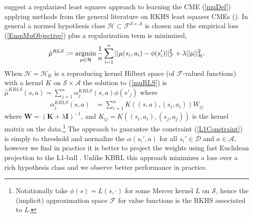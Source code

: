\documentclass[letterpaper]{article}
\newcommand{\GrunewalderEmbeddingsRL}{GrunewalderEmbeddingsMDP}
\newcommand{\GrunewalderEmbeddingsRegression}{GrunewalderEmbeddingsRegression}
\newcommand{\SongNonparametric}{DBLP:journals/jmlr/SongGG10}
\newcommand{\OrmoneitKBRL}{DBLP:journals/ml/OrmoneitS02}
\newcommand{\DuchiProjections}{DBLP:conf/icml/DuchiSSC08}
\newcommand{\TibshiraniLasso}{tibshirani96regression}
\newcommand{\cD}{{\mathcal D}}
\newcommand{\cH}{{\mathcal H}}
\newcommand{\cF}{{\mathcal F}}
\newcommand{\cA}{{\mathcal A}}
\newcommand{\cS}{{\mathcal S}}
\newcommand{\balpha}{{\bm \alpha}}
\newcommand{\bbeta}{{\bm \beta}}
\newcommand{\bK}{{\bm K}}
\newcommand{\bW}{{\bm W}}
\newcommand{\bI}{{\bm I}}
\newcommand{\E}{{\mathbb E}}
\newcommand{\R}{{\mathbb R}}
\newcommand{\argmin}{\operatornamewithlimits{argmin}}
\newcommand{\nn}{\nonumber}
\begin{document}
\cite{\GrunewalderEmbeddingsRL} suggest a regularized least squares approach to learning the CME (\ref{muDef}) applying methods from the general literature on RKHS least squares CMEs (\cite{\SongNonparametric,\GrunewalderEmbeddingsRegression}). In general a normed hypothesis class $\cH\subset \cF^{\cS\times\cA}$ is chosen and the empirical loss (\ref{EmpMuObjective}) plus a regularization term is minimized,
\begin{align}
\hat\mu^{RLS} := \argmin_{\mu\in\cH}  \frac{1}{n}\sum_{i=1}^n || \mu (s_i,a_i) - \phi(s'_i) ||_\cF^2 +\lambda ||\mu||^2_{\cH} . \label{muRLS}
\end{align}
When $\cH=\cH_K$ is a reproducing kernel Hilbert space (of $\cF$-valued functions) with a kernel $K$ on $\cS\times\cA$ the solution to (\ref{muRLS}) is $\hat\mu^{KRLS}(s,a) = \sum_{j=1}^n \alpha_j^{KRLS}(s,a) \phi(s'_j)$ where
\begin{align}
\alpha_j^{KRLS}(s,a) &=  \sum_{i=1}^n K((s,a),(s_i,a_i)) W_{ij}  \label{KRLSalphas}
\end{align}
where $\bW = (\bK + \lambda \bI)^{-1}$, and $K_{ij} = K((s_i,a_i),(s_j,a_j))$ is the kernel matrix on the data.\footnote{Notationally \cite{\GrunewalderEmbeddingsRL} take $\phi(s) = L(s,\cdot)$ for some Mercer kernel $L$ on $\cS$, hence the (implicit) approximation space $\cF$ for value functions is the RKHS associated to $L$.} The approach to guarantee the constraint (\ref{L1Constraint}) is simply to threshold and normalize the $\alpha(s_i',a)$ for all $s_i'\in\cD$ and $a\in\cA$, however we find in practice it is better to project the weights using fast Euclidean projection to the L1-ball \citep[e.g.][]{\DuchiProjections}.%
Unlike KBRL \citep{\OrmoneitKBRL} this approach minimizes a loss over a rich hypothesis class and we observe better performance in practice.
\end{document}
